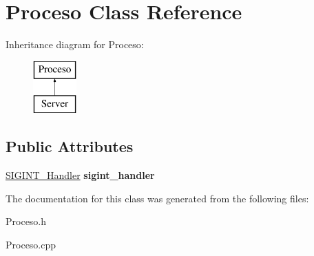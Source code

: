 \hypertarget{classProceso}{\section{Proceso Class Reference}
\label{classProceso}
}
Inheritance diagram for Proceso\-:\begin{figure}[H]
\begin{center}
\leavevmode
\includegraphics[height=2.000000cm]{classProceso}
\end{center}
\end{figure}
\subsection*{Public Attributes}
\begin{DoxyCompactItemize}
\item 
\hypertarget{classProceso_affb17981ef18a4892dd81eac428ab4a9}{\hyperlink{classSIGINT__Handler}{S\-I\-G\-I\-N\-T\-\_\-\-Handler} {\bfseries sigint\-\_\-handler}}\label{classProceso_affb17981ef18a4892dd81eac428ab4a9}

\end{DoxyCompactItemize}


The documentation for this class was generated from the following files\-:\begin{DoxyCompactItemize}
\item 
Proceso.\-h\item 
Proceso.\-cpp\end{DoxyCompactItemize}
